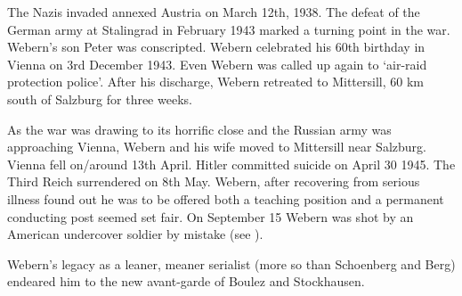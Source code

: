 The Nazis invaded annexed Austria on March 12th, 1938. The defeat of the German army at Stalingrad in February 1943 marked a turning point in the war. Webern's son Peter was conscripted. Webern celebrated his 60th birthday in Vienna on 3rd December 1943. Even Webern was called up again to `air-raid protection police'. After his discharge, Webern retreated to Mittersill, 60 km south of Salzburg for three weeks. 

As the war was drawing to its horrific close and the Russian army was approaching Vienna, Webern and his wife moved to Mittersill near Salzburg. Vienna fell on/around 13th April. Hitler committed suicide on April 30 1945. The Third Reich surrendered on 8th May. Webern, after recovering from serious illness found out he was to be offered both a teaching position and a permanent conducting post seemed set fair. On September 15 Webern was shot by an American undercover soldier by mistake (see \citep[p216]{hayes1995anton}). 

Webern's legacy as a leaner, meaner serialist (more so than Schoenberg and Berg) endeared him to the new avant-garde of Boulez and Stockhausen. 

